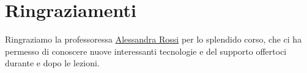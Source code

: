 \chapter{Ringraziamenti}
    Ringraziamo la professoressa \href{mailto:alessandra.rossi@unina.it}{Alessandra Rossi} per lo splendido corso, che ci ha permesso di conoscere nuove interessanti tecnologie e del supporto offertoci durante e dopo le lezioni.
